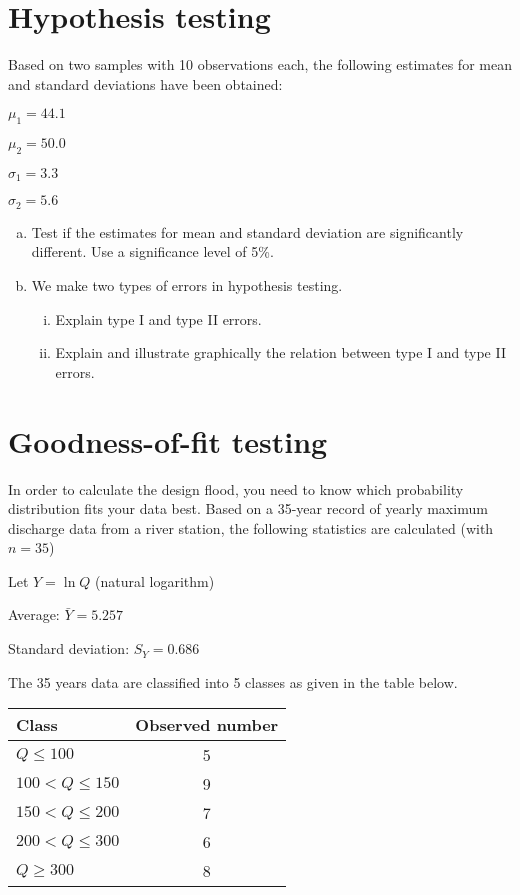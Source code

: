 \documentclass[12pt]{article}
\begin{document}
\section{Hypothesis testing}
Based on two samples with 10 observations each, the following estimates for mean and standard deviations have been obtained:

$\mu_1=44.1$

$\mu_2=50.0$

$\sigma_1=3.3$

$\sigma_2=5.6$


\begin{enumerate}[(a)] 
    \item Test if the estimates for mean and standard deviation are significantly different. Use a significance level of 5\%.
	\item We make two types of errors in hypothesis testing.
    \begin{enumerate}[(i)] 
		\item Explain type I and type II errors.
		\item Explain and illustrate graphically the relation between type I and type II errors.
     \end{enumerate}
\end{enumerate}



\section{Goodness-of-fit testing}
In order to calculate the design flood, you need to know which probability distribution fits your data best. Based on a 35-year record of yearly maximum discharge data from a river station, the following statistics are calculated (with $n = 35$)

Let $Y = \ln Q$ (natural logarithm)

Average: $\bar{Y}=5.257$ 

Standard deviation: $S_Y = 0.686$

The 35 years data are classified into 5 classes as given in the table below.
\begin{table}[h!!]
\begin{tabular}{l|c}
Class & Observed number \\
\hline
$Q \le 100$ & 5 \\
$100<Q \le 150$ & 9 \\
$150<Q \le 200$ & 7 \\
$200<Q \le 300$ & 6 \\
$Q \ge 300$ & 8 \\
\hline
\end{tabular}
\end{table}
\end{document}
